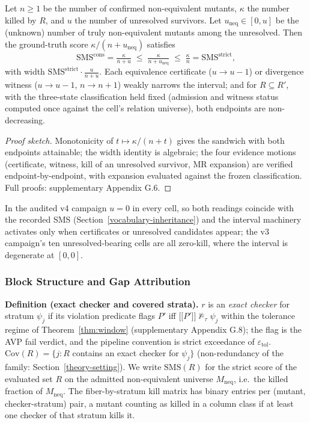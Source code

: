 \documentclass[manuscript,screen,review]{acmart}
\begin{document}
\begin{theorem}\label{thm:interval}
Let $n \geq 1$ be the number of confirmed non-equivalent mutants,
$\kappa$ the number killed by $R$, and $u$ the number of unresolved
survivors. Let $u_{\mathrm{neq}} \in [0, u]$ be the (unknown) number of
truly non-equivalent mutants among the unresolved. Then the ground-truth
score $\kappa/(n + u_{\mathrm{neq}})$ satisfies
\[ \mathrm{SMS}^{\mathrm{cons}} = \tfrac{\kappa}{n+u} \;\leq\; \tfrac{\kappa}{n+u_{\mathrm{neq}}} \;\leq\; \tfrac{\kappa}{n} = \mathrm{SMS}^{\mathrm{strict}}, \]
with width $\mathrm{SMS}^{\mathrm{strict}} \cdot \tfrac{u}{n+u}$. Each
equivalence certificate ($u \to u-1$) or divergence witness
($u \to u-1$, $n \to n+1$) weakly narrows the interval; and for
$R \subseteq R'$, with the three-state classification held fixed
(admission and witness status computed once against the cell's relation
universe), both endpoints are non-decreasing.
\end{theorem}

\begin{proof}[Proof sketch]
Monotonicity of $t \mapsto \kappa/(n+t)$ gives the sandwich with both
endpoints attainable; the width identity is algebraic; the four evidence
motions (certificate, witness, kill of an unresolved survivor, MR
expansion) are verified endpoint-by-endpoint, with expansion evaluated
against the frozen classification. Full proofs: supplementary Appendix
G.6.
\end{proof}

In the audited v4 campaign $u = 0$ in every cell, so both readings
coincide with the recorded SMS
(Section~\ref{vocabulary-inheritance}) and the interval machinery
activates only when certificates or unresolved candidates appear; the
v3 campaign's ten unresolved-bearing cells are all zero-kill, where the
interval is degenerate at $[0, 0]$.

\subsubsection{Block Structure and Gap Attribution}\label{theory-gap}

\textbf{Definition (exact checker and covered strata).} $r$ is an
\emph{exact checker} for stratum $\psi_j$ if its violation predicate
flags $P'$ iff
$\mathopen{\lbrack\!\lbrack} P' \mathclose{\rbrack\!\rbrack} \not\models_{\tau} \psi_j$
within the tolerance regime of Theorem~\ref{thm:window} (supplementary
Appendix G.8); the flag is the AVP fail verdict, and the pipeline
convention is strict exceedance of $\varepsilon_{\mathrm{tol}}$.
$\mathrm{Cov}(R) = \{j : R$ contains an exact checker for $\psi_j\}$
(non-redundancy of the family: Section~\ref{theory-setting}). We write
$\mathrm{SMS}(R)$ for the strict score of the evaluated set $R$ on the
admitted non-equivalent universe $M_{\mathrm{neq}}$, i.e.\ the killed
fraction of $M_{\mathrm{neq}}$. The fiber-by-stratum kill matrix has
binary entries per (mutant, checker-stratum) pair, a mutant counting as
killed in a column class if at least one checker of that stratum kills
it.
\end{document}
